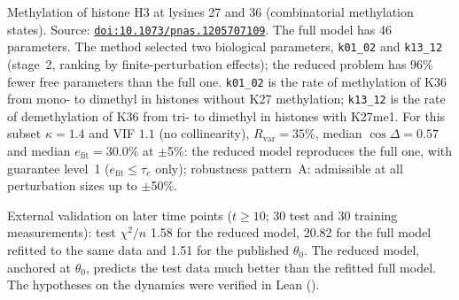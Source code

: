 Methylation of histone H3 at lysines 27 and 36 (combinatorial methylation states). Source: \href{https://doi.org/10.1073/pnas.1205707109}{\nolinkurl{doi:10.1073/pnas.1205707109}}. The full model has 46 parameters. The method selected two biological parameters, \texttt{k01\_02} and \texttt{k13\_12} (stage~2, ranking by finite-perturbation effects); the reduced problem has 96\% fewer free parameters than the full one. \texttt{k01\_02} is the rate of methylation of K36 from mono- to dimethyl in histones without K27 methylation; \texttt{k13\_12} is the rate of demethylation of K36 from tri- to dimethyl in histones with K27me1. For this subset $\kappa=1.4$ and VIF $1.1$ (no collinearity), $R_{\mathrm{var}}=35\%$, median $\cos\Delta=0.57$ and median $e_{\mathrm{fit}}=30.0\%$ at $\pm$5\%: the reduced model reproduces the full one, with guarantee level~1 ($e_{\mathrm{fit}}\le\tau_e$ only); robustness pattern~A: admissible at all perturbation sizes up to $\pm$50\%.

External validation on later time points ($t\ge10$; 30 test and 30 training measurements): test $\chi^2/n$ 1.58 for the reduced model, 20.82 for the full model refitted to the same data and 1.51 for the published $\theta_0$. The reduced model, anchored at $\theta_0$, predicts the test data much better than the refitted full model. The hypotheses on the dynamics were verified in Lean ().

